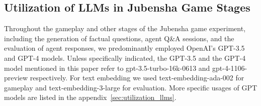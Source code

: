 \documentclass[11pt]{article}
\begin{document}

\subsection{Utilization of LLMs in Jubensha Game Stages}

Throughout the gameplay and other stages of the Jubensha game experiment, including the generation of factual questions, agent Q\&A sessions, and the evaluation of agent responses, we predominantly employed OpenAI's GPT-3.5 and GPT-4 models. Unless specifically indicated, the GPT-3.5 and the GPT-4 model mentioned in this paper refer to gpt-3.5-turbo-16k-0613 and gpt-4-1106-preview respectively. For text embedding we used text-embedding-ada-002 for gameplay and text-embedding-3-large for evaluation. More specific usages of GPT models are listed in the appendix~\ref{sec:utilization_llms}.




\end{document}
